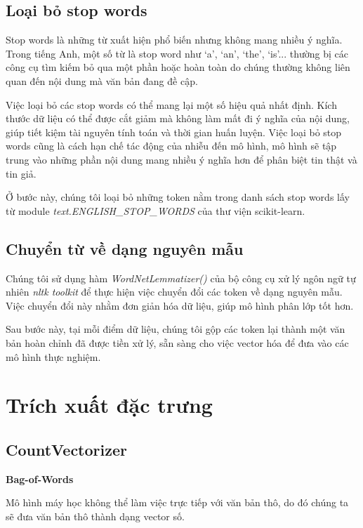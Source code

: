 \documentclass[12pt,a4paper,oneside]{book}
\begin{document}
	\subsection{Loại bỏ stop words}
	
	Stop words là những từ xuất hiện phổ biến nhưng không mang nhiều ý nghĩa. Trong tiếng Anh, một số từ là stop word như `a', `an', `the', `is'...  thường bị các công cụ tìm kiếm bỏ qua một phần hoặc hoàn toàn do chúng thường không liên quan đến nội dung mà văn bản đang đề cập.

 	Việc loại bỏ các stop words có thể mang lại một số hiệu quả nhất định. Kích thước dữ liệu có thể được cắt giảm mà không làm mất đi ý nghĩa của nội dung, giúp tiết kiệm tài nguyên tính toán và thời gian huấn luyện. Việc loại bỏ stop words cũng là cách hạn chế tác động của nhiễu đến mô hình, mô hình sẽ tập trung vào những phần nội dung mang nhiều ý nghĩa hơn để phân biệt tin thật và tin giả.
 	
 	Ở bước này, chúng tôi loại bỏ những token nằm trong danh sách stop words lấy từ module \textit{text.ENGLISH\_STOP\_WORDS} của thư viện scikit-learn.
 	
 	\subsection{Chuyển từ về dạng nguyên mẫu}
 	
 	Chúng tôi sử dụng hàm \textit{WordNetLemmatizer()} của bộ công cụ xử lý ngôn ngữ tự nhiên \textit{nltk toolkit} để thực hiện việc chuyển đổi các token về dạng nguyên mẫu. Việc chuyển đổi này nhằm  đơn giản hóa dữ liệu, giúp mô hình phân lớp tốt hơn.
 	
 	Sau bước này, tại mỗi điểm dữ liệu, chúng tôi gộp các token lại thành một văn bản hoàn chỉnh đã được tiền xử lý, sẵn sàng cho việc vector hóa để đưa vào các mô hình thực nghiệm.
 	
	\section{Trích xuất đặc trưng}
	
	\subsection{CountVectorizer}
	\textbf{Bag-of-Words}
	
	Mô hình máy học không thể làm việc trực tiếp với văn bản thô, do đó chúng ta sẽ đưa văn bản thô thành dạng vector số. 
	
\end{document}

